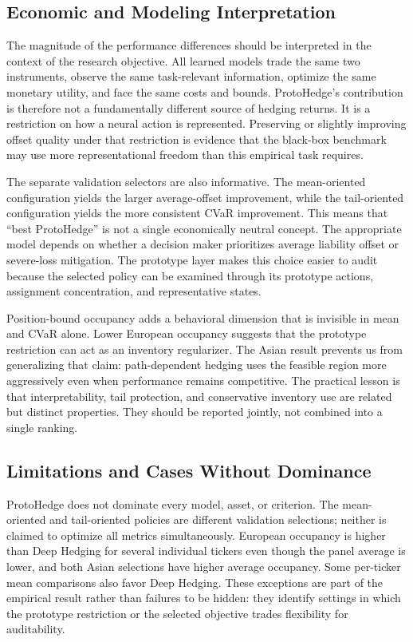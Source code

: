 \documentclass[sigconf]{acmart}
\begin{document}
\subsection{Economic and Modeling Interpretation}

The magnitude of the performance differences should be interpreted in the
context of the research objective. All learned models trade the same two
instruments, observe the same task-relevant information, optimize the same
monetary utility, and face the same costs and bounds. ProtoHedge's contribution
is therefore not a fundamentally different source of hedging returns. It is a
restriction on how a neural action is represented. Preserving or slightly
improving offset quality under that restriction is evidence that the black-box
benchmark may use more representational freedom than this empirical task
requires.

The separate validation selectors are also informative. The mean-oriented
configuration yields the larger average-offset improvement, while the
tail-oriented configuration yields the more consistent CVaR improvement. This
means that ``best ProtoHedge'' is not a single economically neutral concept.
The appropriate model depends on whether a decision maker prioritizes average
liability offset or severe-loss mitigation. The prototype layer makes this
choice easier to audit because the selected policy can be examined through its
prototype actions, assignment concentration, and representative states.

Position-bound occupancy adds a behavioral dimension that is invisible in
mean and CVaR alone. Lower European occupancy suggests that the prototype
restriction can act as an inventory regularizer. The Asian result prevents us
from generalizing that claim: path-dependent hedging uses the feasible region
more aggressively even when performance remains competitive. The practical
lesson is that interpretability, tail protection, and conservative inventory
use are related but distinct properties. They should be reported jointly, not
combined into a single ranking.

\subsection{Limitations and Cases Without Dominance}

ProtoHedge does not dominate every model, asset, or criterion. The
mean-oriented and tail-oriented policies are different validation selections;
neither is claimed to optimize all metrics simultaneously. European occupancy
is higher than Deep Hedging for several individual tickers even though the
panel average is lower, and both Asian selections have higher average
occupancy. Some per-ticker mean comparisons also favor Deep Hedging. These
exceptions are part of the empirical result rather than failures to be hidden:
they identify settings in which the prototype restriction or the selected
objective trades flexibility for auditability.
\end{document}
